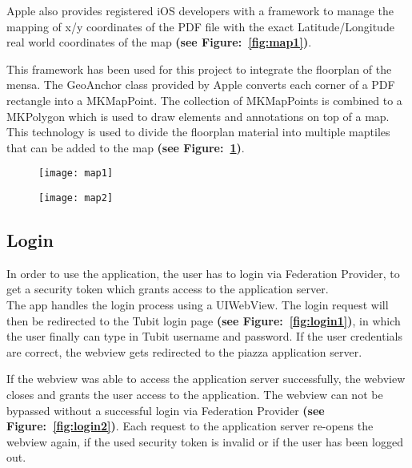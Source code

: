 Apple also provides registered iOS developers with a framework to manage the mapping of x/y coordinates of the PDF file with the exact Latitude/Longitude real world coordinates of the map 
\textbf{(see Figure:~\ref{fig:map1})}.

This framework has been used for this project to integrate the floorplan of the mensa. The GeoAnchor class provided by Apple converts each corner of a PDF rectangle into a MKMapPoint. The collection of MKMapPoints is combined to a MKPolygon which is used to draw elements and annotations on top of a map. This technology is used to divide the floorplan material into multiple maptiles that can be added to the map \textbf{(see Figure:~\ref{fig:map2})}.


\begin{figure}
\centering
\begin{minipage}{.5\textwidth}
  \centering
  \texttt{[image: map1]}
  \label{fig:map1}
\end{minipage}%
\begin{minipage}{.5\textwidth}
  \centering
  \texttt{[image: map2]}
  \label{fig:map2}
\end{minipage}
\end{figure}


\subsection{Login}

In order to use the application, the user has to login via Federation Provider, to get
a security token which grants access to the application server. \\

The app handles the login process using a UIWebView. The login request will then be redirected
to the Tubit login page \textbf{(see Figure:~\ref{fig:login1})}, in which the user finally can type in Tubit username and password.
If the user credentials are correct, the webview gets redirected to the piazza application server.

If the webview was able to access the application server successfully, the webview closes and grants the user access to the application. The webview can not be bypassed without a successful login via Federation Provider \textbf{(see Figure:~\ref{fig:login2})}. Each request to the application server re-opens the webview again, if the used security token is invalid or if the user has been logged out.


